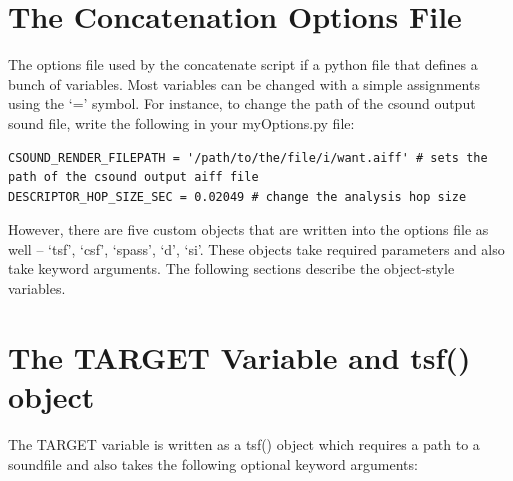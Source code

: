 \documentclass{article}
\begin{document}
\begin{spacing}{1.2}
%
%
%
%

\section{The Concatenation Options File}
The options file used by the concatenate script if a python file that defines a bunch of variables.  Most variables can be changed with a simple assignments using the `=' symbol.  For instance, to change the path of the csound output sound file, write the following in your myOptions.py file:
\begin{lstlisting}
CSOUND_RENDER_FILEPATH = '/path/to/the/file/i/want.aiff' # sets the path of the csound output aiff file
DESCRIPTOR_HOP_SIZE_SEC = 0.02049 # change the analysis hop size
\end{lstlisting}


However, there are five custom objects that are written into the options file as well -- `tsf', `csf', `spass', `d', `si'.  These objects take required parameters and also take keyword arguments.  The following sections describe the object-style variables.

\section{The TARGET Variable and tsf() object}\label{target}
The TARGET variable is written as a tsf() object which requires a path to a soundfile and also takes the following optional keyword arguments:


\end{spacing}
\end{document}
